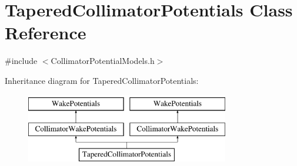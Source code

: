 \hypertarget{classTaperedCollimatorPotentials}{}\section{Tapered\+Collimator\+Potentials Class Reference}
\label{classTaperedCollimatorPotentials}


{\ttfamily \#include $<$Collimator\+Potential\+Models.\+h$>$}

Inheritance diagram for Tapered\+Collimator\+Potentials\+:\begin{figure}[H]
\begin{center}
\leavevmode
\includegraphics[height=3.000000cm]{classTaperedCollimatorPotentials}
\end{center}
\end{figure}
